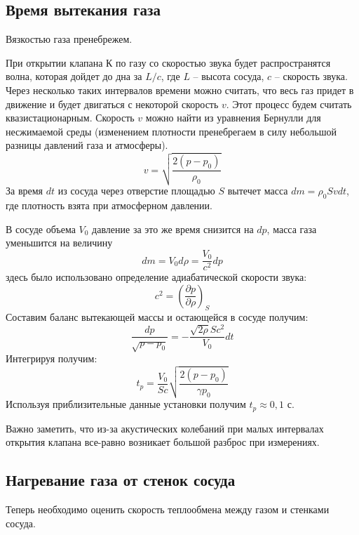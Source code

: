 \documentclass[a4paper,12pt]{report}
\begin{document}
    \subsection*{Время вытекания газа}
    Вязкостью газа пренебрежем.

    При открытии клапана К по газу со скоростью звука будет распространятся волна, которая дойдет до дна за $L/c$, где $L$ -- высота сосуда, $c$ -- скорость звука. Через несколько таких интервалов времени можно считать, что весь газ придет в движение и будет двигаться с некоторой скорость $v$. Этот процесс будем считать квазистационарным. Скорость $v$ можно найти из уравнения Бернулли для несжимаемой среды (изменением плотности пренебрегаем в силу небольшой разницы давлений газа и атмосферы).
    \begin{equation}
        \label{v}
        v=\sqrt{\frac{2(p-p_0)}{\rho_0}}
    \end{equation}
    За время $dt$ из сосуда через отверстие площадью $S$ вытечет масса $dm=\rho_0 S vdt$, где плотность взята при атмосферном давлении.

    В сосуде объема $V_0$ давление за это же время снизится на $dp$, масса газа уменьшится на величину
    \begin{equation*}
        dm=V_0d\rho=\frac{V_0}{c^2}dp
    \end{equation*}
    здесь было использовано определение адиабатической скорости звука:
    \begin{equation*}
        c^2=\left(\frac{\partial p}{\partial \rho}\right)_S
    \end{equation*}
    Составим баланс вытекающей массы и остающейся в сосуде получим:
    \begin{equation*}
        \frac{dp}{\sqrt{p-p_0}}=-\frac{\sqrt{2\rho}Sc^2}{V_0}dt
    \end{equation*}
    Интегрируя получим:
    \begin{equation}
        \label{t_p}
        t_p=\frac{V_0}{Sc}\sqrt{\frac{2(p-p_0)}{\gamma p_0}}
    \end{equation}
    Используя приблизительные данные установки получим $t_p\approx 0,1$ с.

    Важно заметить, что из-за акустических колебаний при малых интервалах открытия клапана все-равно возникает большой разброс при измерениях. 

    \subsection*{Нагревание газа от стенок сосуда} Теперь необходимо оценить скорость теплообмена между газом и стенками сосуда.
\end{document}
